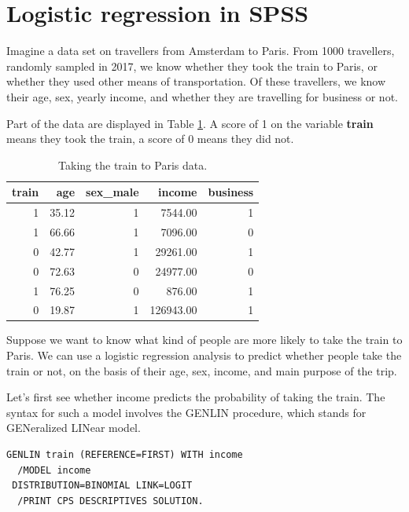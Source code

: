 \documentclass[]{book}\usepackage[]{graphicx}\usepackage[]{color}
\begin{document}
\section{Logistic regression in SPSS}

Imagine a data set on travellers from Amsterdam to Paris. From 1000 travellers, randomly sampled in 2017, we know whether they took the train to Paris, or whether they used other means of transportation. Of these travellers, we know their age, sex, yearly income, and whether they are travelling for business or not.

Part of the data are displayed in Table \ref{tab:gen_12}. A score of 1 on the variable \textbf{train} means they took the train, a score of 0 means they did not.



\begin{table}[ht]
\centering
\caption{Taking the train to Paris data.} 
\label{tab:gen_12}
\begin{tabular}{rrrrr}
  \hline
train & age & sex\_male & income & business \\ 
  \hline
  1 & 35.12 &   1 & 7544.00 &   1 \\ 
    1 & 66.66 &   1 & 7096.00 &   0 \\ 
    0 & 42.77 &   1 & 29261.00 &   1 \\ 
    0 & 72.63 &   0 & 24977.00 &   0 \\ 
    1 & 76.25 &   0 & 876.00 &   1 \\ 
    0 & 19.87 &   1 & 126943.00 &   1 \\ 
   \hline
\end{tabular}
\end{table}



Suppose we want to know what kind of people are more likely to take the train to Paris. We can use a logistic regression analysis to predict whether people take the train or not, on the basis of their age, sex, income, and main purpose of the trip.

Let's first see whether income predicts the probability of taking the train. The syntax for such a model involves the GENLIN procedure, which stands for GENeralized LINear model.



\begin{verbatim}
GENLIN train (REFERENCE=FIRST) WITH income
  /MODEL income
 DISTRIBUTION=BINOMIAL LINK=LOGIT
  /PRINT CPS DESCRIPTIVES SOLUTION.
\end{verbatim}
\end{document}
